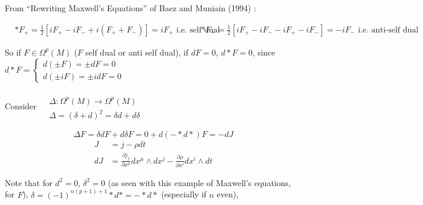 \documentclass[10pt]{amsart}
\begin{document}
\begin{multicols*}{2}
From ``Rewriting Maxwell's Equations'' of Baez and Muniain (1994) \cite{JBaezJMuniain1994}:  


\[
\begin{aligned}
  & *F_+ = \frac{1}{2} \left[ i F_+ -iF_- + i(F_+ + F_-) \right] = iF_+ \text{ i.e. self dual }
  & *F_- = \frac{1}{2} \left[ i F_+ -iF_- - iF_+ -i F_-  \right] = -iF_- \text{ i.e. anti-self dual }
\end{aligned}
\]


So if $F \in \Omega^p(M)$ ($F$ self dual or anti self dual), if $dF=0$, $d*F =0$, since $d*F = \begin{cases} d( \pm F) = \pm dF = 0 \\
  d(\pm iF) = \pm i dF = 0\end{cases}$

Consider $\begin{aligned} & \quad \\
  & \Delta : \Omega^p(M) \to \Omega^p(M) \\
  & \Delta = (\delta +d)^2 = \delta d + d\delta \end{aligned}$

\[
\Delta F = \delta dF + d\delta F = 0 + d (-*d*) F = -dJ 
\]
\[
\begin{aligned}
   J & = j - \rho dt \\ 
   dJ & = \frac{ \partial j_j}{ \partial x^{\mu} } dx^{\mu} \wedge dx^j - \frac{ \partial \rho}{ \partial x^i} dx^i \wedge dt
\end{aligned}
\]


Note that for $d^2 =0$, $\delta^2=0$ (as seen with this example of Maxwell's equations, for $F$), $\delta = (-1)^{n(p+1)+1} *d* = -*d*$ (especially if $n$ even), 

 \quad \quad \, 



\end{multicols*}
\end{document}
